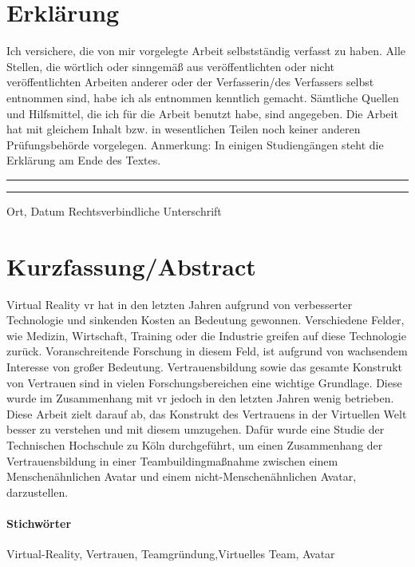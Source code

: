 \documentclass[a4paper,11pt]{article}%
\renewcommand{\\}{\vspace*{0.5\baselineskip} \newline}
\begin{document}
\section*{Erklärung}
	Ich versichere, die von mir vorgelegte Arbeit selbstständig verfasst zu haben. Alle Stellen, die wörtlich oder sinngemäß aus veröffentlichten oder nicht veröffentlichten Arbeiten anderer oder der Verfasserin/des Verfassers selbst entnommen sind, habe ich als entnommen kenntlich gemacht. Sämtliche Quellen und Hilfsmittel, die ich für die Arbeit benutzt habe, sind angegeben. Die Arbeit hat mit gleichem Inhalt bzw. in wesentlichen Teilen noch keiner anderen Prüfungsbehörde vorgelegen.\\
	Anmerkung: In einigen Studiengängen steht die Erklärung am Ende des Textes.\\
	~\\
	~\\
	\rule{0.35\textwidth}{0.4pt} \hspace*{3cm} \rule{0.45\textwidth}{0.4pt} \newline
	Ort, Datum	\hspace*{6.3cm}	Rechtsverbindliche Unterschrift
	\newpage
\section*{Kurzfassung/Abstract}
	Virtual Reality \ac{vr} hat in den letzten Jahren aufgrund von verbesserter Technologie und sinkenden Kosten an Bedeutung gewonnen. Verschiedene Felder, wie Medizin, Wirtschaft, Training oder die Industrie greifen auf diese Technologie zurück. Voranschreitende Forschung in diesem Feld, ist aufgrund von wachsendem Interesse von großer Bedeutung. Vertrauensbildung sowie das gesamte Konstrukt von Vertrauen sind in vielen Forschungsbereichen eine wichtige Grundlage. Diese wurde im Zusammenhang mit \ac{vr} jedoch in den letzten Jahren wenig betrieben. Diese Arbeit zielt darauf ab, das Konstrukt des Vertrauens in der Virtuellen Welt besser zu verstehen und mit diesem umzugehen. Dafür wurde eine Studie der Technischen Hochschule zu Köln durchgeführt, um einen Zusammenhang der Vertrauensbildung in einer Teambuildingmaßnahme zwischen einem Menschenähnlichen Avatar und einem nicht-Menschenähnlichen Avatar, darzustellen.
	
			\paragraph{Stichwörter}
			Virtual-Reality, Vertrauen, Teamgründung,Virtuelles Team, Avatar
			
\end{document}
